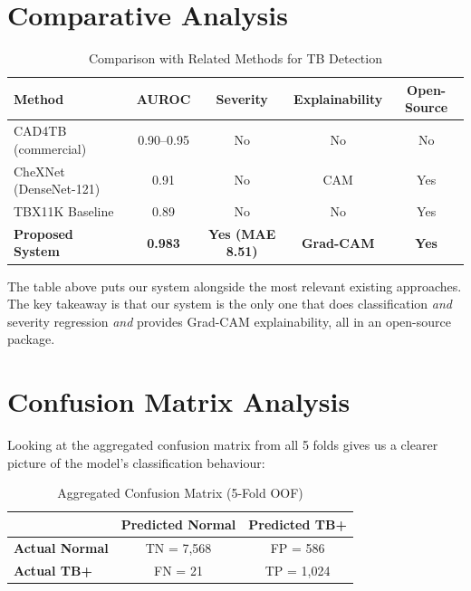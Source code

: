 \documentclass[12pt]{report}
\begin{document}
\section{Comparative Analysis}

\begin{table}[H]
\centering
\caption{Comparison with Related Methods for TB Detection}
\label{tab:comparison}
\small
\renewcommand{\arraystretch}{1.2}
\begin{tabular}{|p{4.5cm}|c|c|c|c|}
\hline
\textbf{Method} & \textbf{AUROC} & \textbf{Severity} & \textbf{Explainability} & \textbf{Open-Source} \\
\hline
CAD4TB (commercial) & 0.90--0.95 & No & No & No \\
CheXNet~\cite{ref6} (DenseNet-121) & 0.91 & No & CAM & Yes \\
TBX11K Baseline~\cite{ref1} & 0.89 & No & No & Yes \\
\textbf{Proposed System} & \textbf{0.983} & \textbf{Yes (MAE 8.51)} & \textbf{Grad-CAM} & \textbf{Yes} \\
\hline
\end{tabular}
\end{table}

The table above puts our system alongside the most relevant existing approaches. The key takeaway is that our system is the only one that does classification \textit{and} severity regression \textit{and} provides Grad-CAM explainability, all in an open-source package.

\section{Confusion Matrix Analysis}

Looking at the aggregated confusion matrix from all 5 folds gives us a clearer picture of the model's classification behaviour:

\begin{table}[H]
\centering
\caption{Aggregated Confusion Matrix (5-Fold OOF)}
\renewcommand{\arraystretch}{1.3}
\begin{tabular}{|l|c|c|}
\hline
& \textbf{Predicted Normal} & \textbf{Predicted TB+} \\
\hline
\textbf{Actual Normal} & TN = 7,568 & FP = 586 \\
\textbf{Actual TB+} & FN = 21 & TP = 1,024 \\
\hline
\end{tabular}
\end{table}
\end{document}
